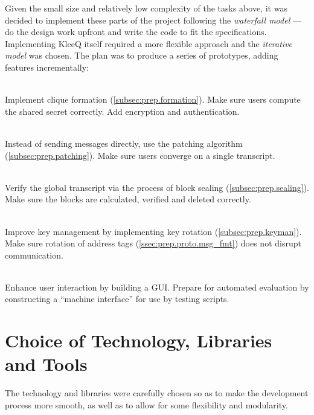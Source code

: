 \documentclass[a4paper, 12pt]{report}
\begin{document}
Given the small size and relatively low complexity of the tasks above, it was decided to implement these parts of the project following the \emph{waterfall model} --- do the design work upfront and write the code to fit the specifications. \\

Implementing KleeQ itself required a more flexible approach and the \emph{iterative model} was chosen. The plan was to produce a series of prototypes, adding features incrementally:
\begin{description}[labelindent=0.5cm, leftmargin=1.3cm, rightmargin=0.5cm]
    \item[Prototype 1: Clique Formation]\hfill \\
        Implement clique formation (\cref{subsec:prep.formation}). Make sure users compute the shared secret correctly. Add encryption and authentication.
    \item[Prototype 2: Patching]\hfill \\
        Instead of sending messages directly, use the patching algorithm (\cref{subsec:prep.patching}). Make sure users converge on a single transcript.
    \item[Prototype 3: Sealing]\hfill \\
        Verify the global transcript via the process of block sealing (\cref{subsec:prep.sealing}). Make sure the blocks are calculated, verified and deleted correctly.
    \item[Prototype 4: Key Management]\hfill \\
        Improve key management by implementing key rotation (\cref{subsec:prep.keyman}). Make sure rotation of address tags (\cref{ssec:prep.proto.msg_fmt}) does not disrupt communication.
    \item[Prototype 5: Interface] \hfill \\
        Enhance user interaction by building a GUI. Prepare for automated evaluation by constructing a ``machine interface'' for use by testing scripts. 
\end{description}

\section{Choice of Technology, Libraries and Tools}
\label{sec:choices}
The technology and libraries were carefully chosen so as to make the development process more smooth, as well as to allow for some flexibility and modularity.
\end{document}
